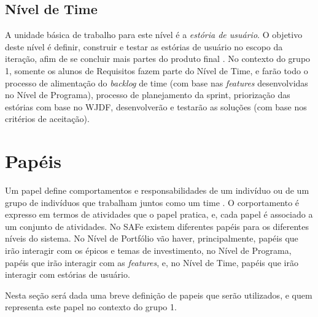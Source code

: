 \subsection{Nível de Time}
A unidade básica de trabalho para este nível é a \emph{estória de usuário}. O objetivo deste nível é definir, construir e testar as estórias de usuário no escopo da iteração, afim de se concluir mais partes do produto final \cite[p. 47-48]{safe001}. No contexto do grupo 1, somente os alunos de Requisitos fazem parte do Nível de Time, e farão todo o processo de alimentação do \emph{backlog} de time (com base nas \emph{features} desenvolvidas no Nível de Programa), processo de planejamento da sprint, priorização das estórias com base no WJDF, desenvolverão e testarão as soluções (com base nos critérios de aceitação).

\section{Papéis}
Um papel define comportamentos e responsabilidades de um indivíduo ou de um grupo de indivíduos que trabalham juntos como um time \cite[p. 61-65]{kruchten001}. O corportamento é expresso em termos de atividades que o papel pratica, e, cada papel é associado a um conjunto de atividades. No SAFe existem diferentes papéis para os diferentes níveis do sistema. No Nível de Portfólio vão haver, principalmente, papéis que irão interagir com os épicos e temas de investimento, no Nível de Programa, papéis que irão interagir com as \emph{features}, e, no Nível de Time, papéis que irão interagir com estórias de usuário.

Nesta seção será dada uma breve definição de papeis que serão utilizados, e quem representa este papel no contexto do grupo 1.



